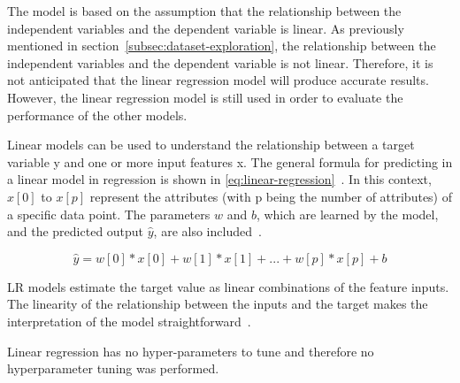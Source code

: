 The model is based on the assumption that the relationship between the independent
variables and the dependent variable is linear.
As previously mentioned in section~\ref{subsec:dataset-exploration}, the relationship between the
independent variables and the dependent variable is not linear.
Therefore, it is not anticipated that the linear regression model will produce accurate results.
However, the linear regression model is still used in order to evaluate the performance of the
other models.

Linear models can be used to understand the relationship between a target variable y
and one or more input features x.
The general formula for predicting in a linear model in regression is shown in
\ref{eq:linear-regression}~\cite[p. 45]{muller_introductionmachinelearning_2016}.
In this context, $x[0]$ to $x[p]$ represent the attributes (with p being the number of
attributes) of a specific data point.
The parameters $w$ and $b$, which are learned by the model, and the predicted output $\hat{y}$,
are also included~\cite[p. 45]{muller_introductionmachinelearning_2016}.

\begin{tcolorbox}[arc=0pt,boxrule=0.5pt]
    \begin{equation}
        \hat{y} = w[0] * x[0] + w[1] * x[1] + ... + w[p] * x[p] + b
        \label{eq:linear-regression}
    \end{equation}
\end{tcolorbox}

\ac{LR} models estimate the target value as linear combinations of the feature inputs.
The linearity of the relationship between the inputs and the target makes the
interpretation of the model straightforward~\cite[p. 37]{molnar2020interpretable}.

Linear regression has no hyper-parameters to tune and therefore no
hyperparameter tuning was performed.

%
%

